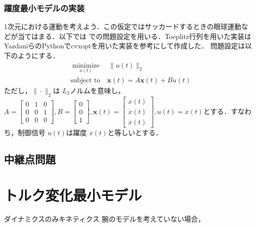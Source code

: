 \subsubsection{躍度最小モデルの実装}
1次元における運動を考えよう．この仮定ではサッカードするときの眼球運動などが当てはまる．以下では \citep{Yazdani2012-sx} での問題設定を用いる．Toeplitz行列を用いた実装はYazdaniらのPythonでcvxoptを用いた実装を参考にして作成した．
問題設定は以下のようにする．
\begin{align}
&\underset{u(t)}{\operatorname{minimize}}\quad \|u(t)\|_2 \\
&\text{subject to} \quad \dot{\mathbf{x}}(t)=A \mathbf{x}(t)+B u(t)
\end{align}
ただし，$\|\cdot\|_{2}$は $L_{2}$ノルムを意味し，$A=\left[\begin{array}{lll}0 & 1 & 0 \\ 0 & 0 & 1 \\ 0 & 0 & 0\end{array}\right], B=\left[\begin{array}{l}0 \\ 0 \\ 1\end{array}\right], \mathbf{x}(t)=\left[\begin{array}{l}x(t) \\ \dot{x}(t) \\ \ddot{x}(t)\end{array}\right], u(t)=\dddot x(t)$とする．すなわち，制御信号 $u(t)$は躍度 $\dddot x(t)$と等しいとする．
\subsection{中継点問題}
\section{トルク変化最小モデル}
ダイナミクスのみキネティクス
腕のモデルを考えていない場合，
